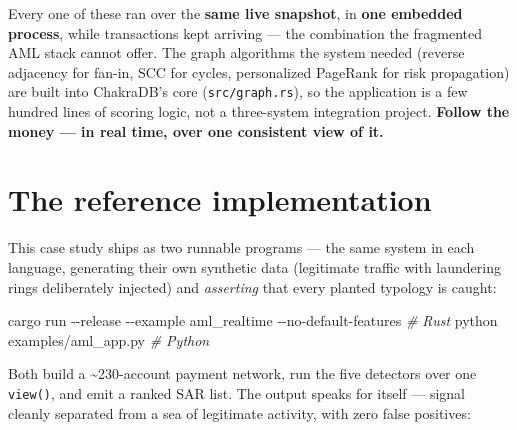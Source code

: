 \documentclass[
  11pt,
  openany]{book}
\newenvironment{Shaded}{}{}
\newcommand{\AttributeTok}[1]{\textcolor[rgb]{0.49,0.56,0.16}{#1}}
\newcommand{\CommentTok}[1]{\textcolor[rgb]{0.38,0.63,0.69}{\textit{#1}}}
\newcommand{\ExtensionTok}[1]{#1}
\newcommand{\NormalTok}[1]{#1}
\begin{document}
Every one of these ran over the \textbf{same live snapshot}, in
\textbf{one embedded process}, while transactions kept arriving --- the
combination the fragmented AML stack cannot offer. The graph algorithms
the system needed (reverse adjacency for fan-in, SCC for cycles,
personalized PageRank for risk propagation) are built into ChakraDB's
core (\texttt{src/graph.rs}), so the application is a few hundred lines
of scoring logic, not a three-system integration project. \textbf{Follow
the money --- in real time, over one consistent view of it.}

\section{The reference
implementation}\label{the-reference-implementation}

This case study ships as two runnable programs --- the same system in
each language, generating their own synthetic data (legitimate traffic
with laundering rings deliberately injected) and \emph{asserting} that
every planted typology is caught:

\begin{Shaded}
\begin{Highlighting}[]
\ExtensionTok{cargo}\NormalTok{ run }\AttributeTok{{-}{-}release} \AttributeTok{{-}{-}example}\NormalTok{ aml\_realtime }\AttributeTok{{-}{-}no{-}default{-}features}   \CommentTok{\# Rust}
\ExtensionTok{python}\NormalTok{ examples/aml\_app.py                                          }\CommentTok{\# Python}
\end{Highlighting}
\end{Shaded}

Both build a \textasciitilde230-account payment network, run the five
detectors over one \texttt{view()}, and emit a ranked SAR list. The
output speaks for itself --- signal cleanly separated from a sea of
legitimate activity, with zero false positives:
\end{document}
